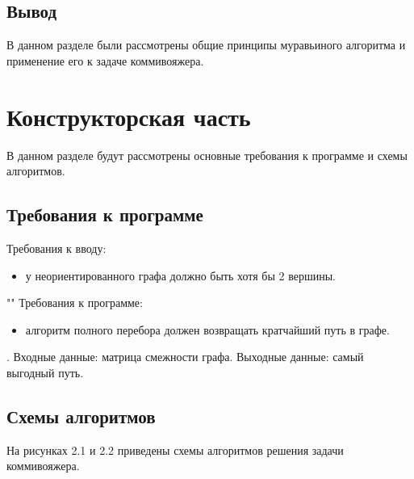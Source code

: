 \documentclass[12pt]{report}
\begin{document}
\section*{Вывод}
В данном разделе были рассмотрены общие принципы муравьиного алгоритма и применение его к задаче коммивояжера. 


\newpage
\chapter{Конструкторская часть}
В данном разделе будут рассмотрены основные требования к программе и схемы алгоритмов.

\section{Требования к программе}
\noindent Требования к вводу:
\begin{itemize}
	\item у неориентированного графа должно быть хотя бы 2 вершины.
\end{itemize}

""\newline
Требования к программе:
\begin{itemize}
	\item алгоритм полного перебора должен возвращать кратчайший путь в графе.
\end{itemize}
 .  
\newline  
Входные данные: матрица смежности графа.  
\newline
Выходные данные: самый выгодный путь.

\section{Схемы алгоритмов}
На рисунках 2.1 и 2.2 приведены схемы алгоритмов решения задачи коммивояжера.
\end{document}
